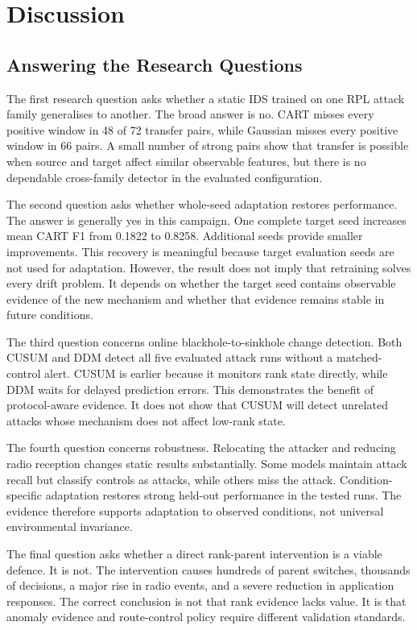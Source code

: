 \chapter{Discussion}
\label{chap:discussion}

\section{Answering the Research Questions}

The first research question asks whether a static IDS trained on one RPL attack family generalises to another. The broad answer is no. CART misses every positive window in 48 of 72 transfer pairs, while Gaussian misses every positive window in 66 pairs. A small number of strong pairs show that transfer is possible when source and target affect similar observable features, but there is no dependable cross-family detector in the evaluated configuration.

The second question asks whether whole-seed adaptation restores performance. The answer is generally yes in this campaign. One complete target seed increases mean CART F1 from 0.1822 to 0.8258. Additional seeds provide smaller improvements. This recovery is meaningful because target evaluation seeds are not used for adaptation. However, the result does not imply that retraining solves every drift problem. It depends on whether the target seed contains observable evidence of the new mechanism and whether that evidence remains stable in future conditions.

The third question concerns online blackhole-to-sinkhole change detection. Both CUSUM and DDM detect all five evaluated attack runs without a matched-control alert. CUSUM is earlier because it monitors rank state directly, while DDM waits for delayed prediction errors. This demonstrates the benefit of protocol-aware evidence. It does not show that CUSUM will detect unrelated attacks whose mechanism does not affect low-rank state.

The fourth question concerns robustness. Relocating the attacker and reducing radio reception changes static results substantially. Some models maintain attack recall but classify controls as attacks, while others miss the attack. Condition-specific adaptation restores strong held-out performance in the tested runs. The evidence therefore supports adaptation to observed conditions, not universal environmental invariance.

The final question asks whether a direct rank-parent intervention is a viable defence. It is not. The intervention causes hundreds of parent switches, thousands of decisions, a major rise in radio events, and a severe reduction in application responses. The correct conclusion is not that rank evidence lacks value. It is that anomaly evidence and route-control policy require different validation standards.

